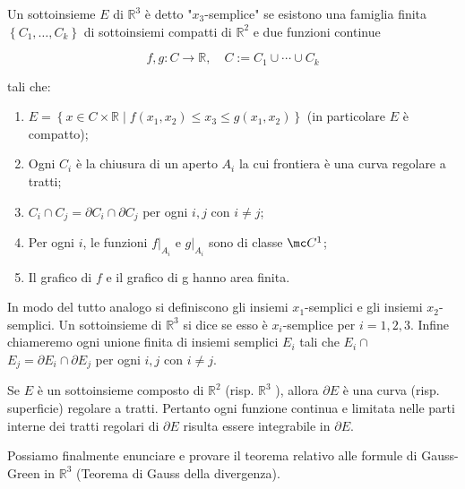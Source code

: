 \begin{boxdef}
    Un sottoinsieme $E$ di $\mathbb{R}^{3}$ è detto "$x_{3}$-semplice" se esistono una famiglia finita $\left\{C_{1}, \ldots, C_{k}\right\}$ di sottoinsiemi compatti di $\mathbb{R}^{2}$ e due funzioni continue

    \[
    f, g: C \rightarrow \mathbb{R}, \quad C:=C_{1} \cup \cdots \cup C_{k}
    \]

    tali che:
    \begin{enumerate}[label = $\roman*)$]
        \item $E=\left\{x \in C \times \mathbb{R} \mid f\left(x_{1}, x_{2}\right) \leq x_{3} \leq g\left(x_{1}, x_{2}\right)\right\}$ (in particolare $E$ è compatto);
        
        \item Ogni $C_{i}$ è la chiusura di un aperto $A_{i}$ la cui frontiera è una curva regolare a tratti;
        
        \item $C_{i} \cap C_{j}=\partial C_{i} \cap \partial C_{j}$ per ogni $i, j$ con $i \neq j$;
        
        \item Per ogni $i$, le funzioni $\left.f\right|_{A_{i}}$ e $\left.g\right|_{A_{i}}$ sono di classe $\mc C^{1}$;
        
        \item Il grafico di $f$ e il grafico di g hanno area finita.
    \end{enumerate}

    In modo del tutto analogo si definiscono gli insiemi $x_{1}$-semplici e gli insiemi $x_{2}$-semplici. Un sottoinsieme di $\mathbb{R}^{3}$ si dice  se esso è $x_{i}$-semplice per $i=1,2,3$. Infine chiameremo  ogni unione finita di insiemi semplici $E_{i}$ tali che $E_{i} \cap$ $E_{j}=\partial E_{i} \cap \partial E_{j}$ per ogni $i, j$ con $i \neq j$.
\end{boxdef}

\begin{oss}
    Se $E$ è un sottoinsieme composto di $\mathbb{R}^{2}$ (risp. $\mathbb{R}^{3}$ ), allora $\partial E$ è una curva (risp. superficie) regolare a tratti. Pertanto ogni funzione continua e limitata nelle parti interne dei tratti regolari di $\partial E$ risulta essere integrabile in $\partial E$.
\end{oss}

Possiamo finalmente enunciare e provare il teorema relativo alle formule di Gauss-Green in $\mathbb{R}^{3}$ (Teorema di Gauss della divergenza).

